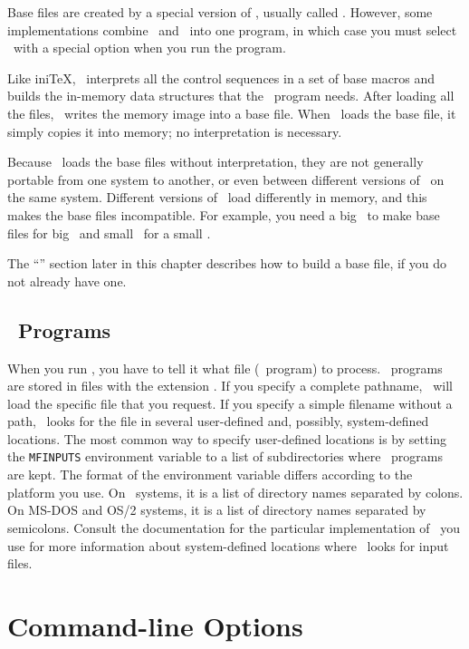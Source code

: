 Base files are created by a special version of \MF, usually called
\iniMF.  However, some implementations combine \MF\ and \iniMF\
into one program, in which case you must select \iniMF\ with a special
option when you run the program.  

Like ini\TeX, \iniMF\ interprets all the control sequences in a set of
base macros and builds the in-memory data structures that the \MF\
program needs.  After loading all the files, \iniMF\ writes
the memory image into a base file.  When \MF\
loads the base file, it simply copies it into memory; no
interpretation is necessary.  

Because \MF\ loads the base files without interpretation, they are not
generally portable from one system to another, or even between
different versions of \MF\ on the same system.  Different versions of
\MF\ load differently in memory, and this makes the base files
incompatible.  For example, you need a big \iniMF\ to make
base files for big \MF\ and small \iniMF\ for a small \MF.

The ``\nameref{sec:mf:gettingstarted}'' section later in this chapter 
describes how to build a base file, if you do not already have one.

\subsection{\protect\MF\ Programs}

When you run \MF, you have to tell it what 
file (\MF\ program) to
process.  \MF\ programs are stored in files with the extension .
If you specify a complete pathname, \MF\ will load the
specific file that you request.  If you specify a simple filename
without a path, \MF\ looks for the file in several user-defined and,
possibly, system-defined locations.  The most common way to specify
user-defined locations is by setting the \verb|MFINPUTS|
environment variable to a list of subdirectories where \MF\ programs
are kept.  The format of the environment variable differs according to
the platform you use.  On \Unix\ systems, it is 
a list of directory names separated by colons.  On MS-DOS and OS/2 systems, 
it is a
list of directory names separated by semicolons.  Consult the
documentation for the particular implementation of \MF\ you use
for more information about system-defined locations where \MF\
looks for input files.

\section{Command-line Options}

